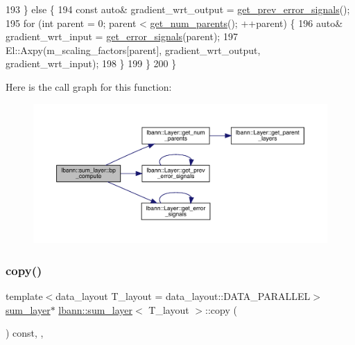 \begin{DoxyCode}
193     \} \textcolor{keywordflow}{else} \{
194       \textcolor{keyword}{const} \textcolor{keyword}{auto}& gradient\_wrt\_output = \hyperlink{classlbann_1_1Layer_a7ac4579d3c1671dfaf86e3b618d6938a}{get\_prev\_error\_signals}();
195       \textcolor{keywordflow}{for} (\textcolor{keywordtype}{int} parent = 0; parent < \hyperlink{classlbann_1_1Layer_ac9290d4a6453ccda5f6b4d8b57b49ba3}{get\_num\_parents}(); ++parent) \{
196         \textcolor{keyword}{auto}& gradient\_wrt\_input = \hyperlink{classlbann_1_1Layer_adb561e140e0bb601f3c5a8ee053a71d2}{get\_error\_signals}(parent);
197         El::Axpy(m\_scaling\_factors[parent], gradient\_wrt\_output, gradient\_wrt\_input);
198       \}
199     \}
200   \}
\end{DoxyCode}
Here is the call graph for this function\+:\nopagebreak
\begin{figure}[H]
\begin{center}
\leavevmode
\includegraphics[width=350pt]{classlbann_1_1sum__layer_a0dcddd056cf81c1fbea22a5e1c01c6d9_cgraph}
\end{center}
\end{figure}
\mbox{\label{classlbann_1_1sum__layer_a8b6581df51a10b1511c1df6322f445a4}} 
\subsubsection{\texorpdfstring{copy()}{copy()}}
{\footnotesize\ttfamily template$<$data\+\_\+layout T\+\_\+layout = data\+\_\+layout\+::\+D\+A\+T\+A\+\_\+\+P\+A\+R\+A\+L\+L\+EL$>$ \\
\hyperlink{classlbann_1_1sum__layer}{sum\+\_\+layer}$\ast$ \hyperlink{classlbann_1_1sum__layer}{lbann\+::sum\+\_\+layer}$<$ T\+\_\+layout $>$\+::copy (\begin{DoxyParamCaption}{ }\end{DoxyParamCaption}) const\hspace{0.3cm}{\ttfamily [inline]}, {\ttfamily [override]}, {\ttfamily [virtual]}}

